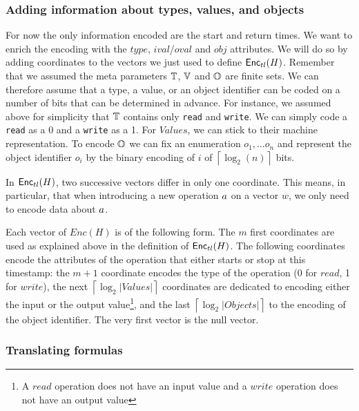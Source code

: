 \subsubsection{Adding information about types, values, and objects}

For now the only information encoded are the start and return times. We want to enrich the encoding with the $type$, $ival$/$oval$ and $obj$ attributes. 
We will do so by adding coordinates to the vectors we just used to define $\mathsf{Enc}_{tl}(H)$. 
Remember that we assumed the meta parameters $\mathbb{T}$, $\mathbb{V}$ and $\mathbb{O}$ are finite sets. 
We can therefore assume that a type, a value, or an object identifier can be coded on a number of bits that can be determined in advance. 
For instance, we assumed above for simplicity that $\mathbb{T}$ contains only \texttt{read} and \texttt{write}.
We can simply code a \texttt{read} as a 0 and a \texttt{write} as a 1. For $Values$, we can stick to their machine representation. To encode $\mathbb{O}$ we can fix an enumeration $o_1,\ldots o_n$ and represent the object identifier $o_i$ by the binary encoding of $i$ of $\left\lceil\log_2(n)\right\rceil$ bits.

In $\mathsf{Enc}_{tl}(H)$, two successive vectors differ in only one coordinate. This means, in particular, that when introducing a new operation $a$ on a vector $w$, we only need to encode data about $a$. 

Each vector of $Enc(H)$ is of the following form. The $m$ first coordinates are used as explained above in the definition of $\mathsf{Enc}_{tl}(H)$. The following coordinates encode the attributes of the operation that either starts or stop at this timestamp: the $m+1$ coordinate encodes the type of the operation (0 for $read$, 1 for $write$), the next $\left\lceil \log_2 |Values| \right\rceil$ coordinates are dedicated to encoding either the input or the output value\footnote{A $read$ operation does not have an input value and a $write$ operation does not have an output value}, and the last $\left\lceil \log_2 |Objects| \right\rceil$ to the encoding of the object identifier. The very first vector is the null vector.

\subsubsection{Translating formulas}

